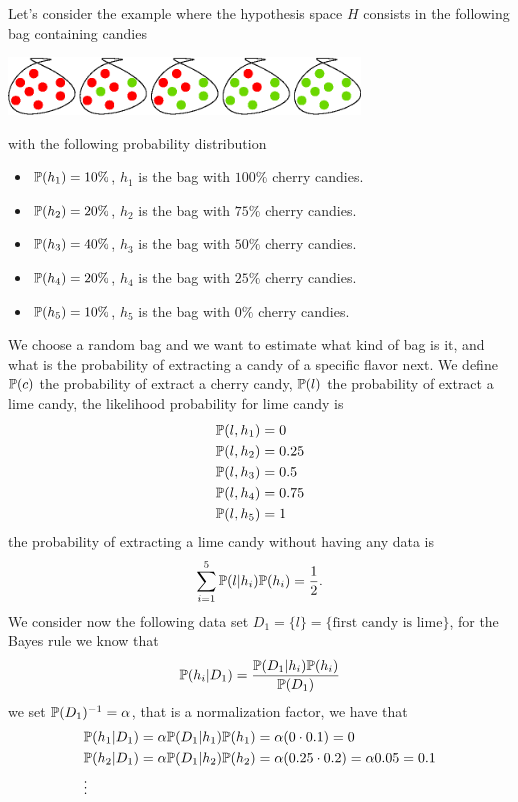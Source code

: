 \documentclass[10pt, letterpaper]{report}
\begin{document}
Let's consider the example where the hypothesis space $H$ consists in the following bag containing candies\begin{center}
    \includegraphics[width=0.7\textwidth]{images/candies.eps}
\end{center}
with the following probability distribution\begin{itemize}
    \item ${\mathbb P}(h_1)=10\%$, $h_1$ is the bag with $100\%$ cherry candies.
    \item ${\mathbb P}(h_2)=20\%$, $h_2$ is the bag with $75\%$ cherry candies.
    \item ${\mathbb P}(h_3)=40\%$, $h_3$ is the bag with $50\%$ cherry candies.
    \item ${\mathbb P}(h_4)=20\%$, $h_4$ is the bag with $25\%$ cherry candies.
    \item ${\mathbb P}(h_5)=10\%$, $h_5$ is the bag with $0\%$ cherry candies.
\end{itemize}
We choose a random bag and we want to estimate what kind of bag is it, and what is the probability of extracting a candy of a specific flavor next. We define ${\mathbb P}(c)$ the probability of extract a cherry candy, ${\mathbb P}(l)$ the probability of extract a lime candy,  the likelihood probability for lime candy is\begin{align*}
    &{\mathbb P}(l,h_1)=0\\
    &{\mathbb P}(l,h_2)=0.25\\
    &{\mathbb P}(l,h_3)=0.5\\
    &{\mathbb P}(l,h_4)=0.75\\
    &{\mathbb P}(l,h_5)=1
\end{align*}
the probability of extracting a lime candy without having any data is\begin{equation}
    \sum_{i=1}^5{\mathbb P}(l|h_i){\mathbb P}(h_i)=\frac{1}{2}.
\end{equation}
We consider now the following data set $D_1=\{l\}=\{\text{first candy is lime}\}$, for the Bayes rule we know that\begin{equation}
    {\mathbb P}(h_i|D_1)=\frac{{\mathbb P}(D_1|h_i){\mathbb P}(h_i)}{{\mathbb P}(D_1)}
\end{equation}
we set ${\mathbb P}(D_1)^{-1}=\alpha$, that is a normalization factor, we have that\begin{align*}
    &{\mathbb P}(h_1|D_1)=\alpha{\mathbb P}(D_1|h_1){\mathbb P}(h_1)=\alpha(0\cdot 0.1)=0\\
    &{\mathbb P}(h_2|D_1)=\alpha{\mathbb P}(D_1|h_2){\mathbb P}(h_2)=\alpha(0.25\cdot 0.2)=\alpha0.05=0.1\\
    &\vdots 
\end{align*}
\end{document}
